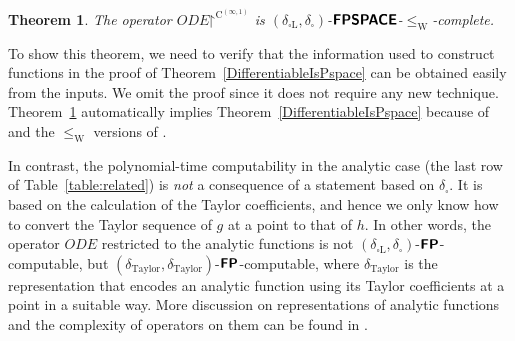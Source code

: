 \documentclass[12pt,a4paper]{article}
\newtheorem{theorem}{Theorem}%
\theoremstyle{definition}
\theoremstyle{remark}
\newcommand{\N}{\mathbf N}
\newcommand{\OpIVP}{\mathit{ODE}}
\newcommand{\deltabox}{\delta _\square}
\newcommand{\deltaboxLip}{\delta _{\square \mathrm L}}
\newcommand{\deltaTaylor}{\delta _{\mathrm{Taylor}}}
\newcommand{\classtwofont}[1]{\text{\bfseries \sffamily \upshape #1}}
\newcommand{\classFPtwo}{\classtwofont{FP}}
\newcommand{\classFPSPACEtwo}{\classtwofont{FPSPACE}}
\newcommand{\classCHtwo}{\classtwofont{CH}}
\newcommand{\redW}{\leq _{\mathrm W}}
\newcommand{\classC}{\mathrm C}
\begin{document}
\begin{theorem}
\label{theorem: C1 constructive}
The operator $\OpIVP \mathord\upharpoonright ^{\classC ^{(\infty, 1)}}$ is $(\deltaboxLip, \deltabox)$-$\classFPSPACEtwo$-$\redW$-complete.
\end{theorem}

To show this theorem,
we need to verify that the information used to construct functions in the proof of Theorem~\ref{DifferentiableIsPspace}
can be obtained easily from the inputs.
We omit the proof since it does not require any new technique.
Theorem~\ref{theorem: C1 constructive}
automatically implies Theorem~\ref{DifferentiableIsPspace} 
because of \cite[Lemmas 4.7 and 4.8]{kawamura2010operators} and 
the $\redW$ versions of \cite[Lemmas 3.11 and 3.12]{kawamura2010operators}. 


In contrast, 
the polynomial-time computability in the analytic case
(the last row of Table~\ref{table:related})
is \emph{not} a consequence of a statement based on $\deltabox$. 
It is based on the calculation of the Taylor coefficients, 
and hence we only know how 
to convert the Taylor sequence of $g$ at a point to that of $h$. 
In other words, 
the operator $\OpIVP$ restricted to the analytic functions
is not $(\deltaboxLip, \deltabox)$-$\classFPtwo$-computable, 
but $(\deltaTaylor, \deltaTaylor)$-$\classFPtwo$-computable, 
where $\deltaTaylor$ is the representation that 
encodes an analytic function using its Taylor coefficients at a point 
in a suitable way. 
More discussion on representations of analytic functions 
and the complexity of operators on them 
can be found in 
\cite{kawamura12:_unifor_polyt_comput_operat_univar}. 
\end{document}
